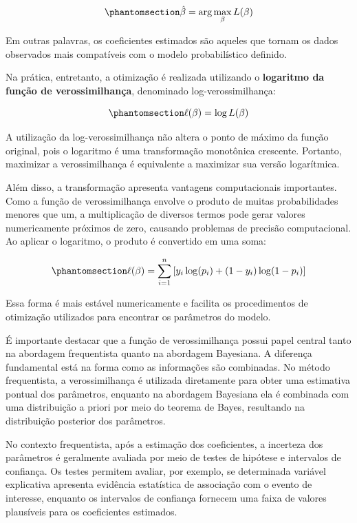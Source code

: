 \documentclass[
  brazilian,
  12pt,
  letterpaper,
  DIV=11,
  numbers=noendperiod]{scrartcl}
\begin{document}
\begin{equation}\protect\phantomsection\label{eq-mle-logistica}{
\hat{\beta}=\arg\max_{\beta}L(\beta)
}\end{equation}

Em outras palavras, os coeficientes estimados são aqueles que tornam os
dados observados mais compatíveis com o modelo probabilístico definido.

Na prática, entretanto, a otimização é realizada utilizando o
\textbf{logaritmo da função de verossimilhança}, denominado
log-verossimilhança:

\begin{equation}\protect\phantomsection\label{eq-log-verossimilhaneca}{
\ell(\beta)=\log L(\beta)
}\end{equation}

A utilização da log-verossimilhança não altera o ponto de máximo da
função original, pois o logaritmo é uma transformação monotônica
crescente. Portanto, maximizar a verossimilhança é equivalente a
maximizar sua versão logarítmica.

Além disso, a transformação apresenta vantagens computacionais
importantes. Como a função de verossimilhança envolve o produto de
muitas probabilidades menores que um, a multiplicação de diversos termos
pode gerar valores numericamente próximos de zero, causando problemas de
precisão computacional. Ao aplicar o logaritmo, o produto é convertido
em uma soma:

\begin{equation}\protect\phantomsection\label{eq-log-verossimilhaneca-expandida}{
\ell(\beta)=\sum_{i=1}^{n}
\left[y_i\log(p_i)+(1-y_i)\log(1-p_i)\right]
}\end{equation}

Essa forma é mais estável numericamente e facilita os procedimentos de
otimização utilizados para encontrar os parâmetros do modelo.

É importante destacar que a função de verossimilhança possui papel
central tanto na abordagem frequentista quanto na abordagem Bayesiana. A
diferença fundamental está na forma como as informações são combinadas.
No método frequentista, a verossimilhança é utilizada diretamente para
obter uma estimativa pontual dos parâmetros, enquanto na abordagem
Bayesiana ela é combinada com uma distribuição a priori por meio do
teorema de Bayes, resultando na distribuição posterior dos parâmetros.

No contexto frequentista, após a estimação dos coeficientes, a incerteza
dos parâmetros é geralmente avaliada por meio de testes de hipótese e
intervalos de confiança. Os testes permitem avaliar, por exemplo, se
determinada variável explicativa apresenta evidência estatística de
associação com o evento de interesse, enquanto os intervalos de
confiança fornecem uma faixa de valores plausíveis para os coeficientes
estimados.
\end{document}
